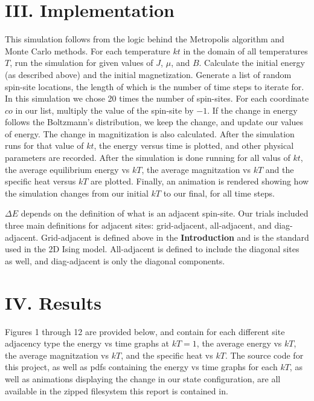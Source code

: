 \documentclass{article}
\begin{document}
\section*{III. Implementation}
\indent \indent This simulation follows from the logic behind the Metropolis algorithm
and Monte Carlo methods. For each temperature $kt$ in the domain of all
temperatures $T$,  run the simulation for given values of $J$, $\mu$, and $B$.
Calculate the initial energy (as described above) and the initial magnetization.
Generate a list of random spin-site locations, the length of which is the number
of time steps to iterate for. In this simulation we chose 20 times the number of 
spin-sites. For each coordinate $co$ in our list, multiply the value of the
spin-site by $-1$. If the change in energy follows the Boltzmann's distribution,
we keep the change, and update our values of energy. The change in magnitization 
is also calculated. After the simulation runs for that value of $kt$, the energy
versus time is plotted, and other physical parameters are recorded. After the
simulation is done running for all valus of $kt$, the average equilibrium energy
vs $kT$, the average magnitzation vs $kT$ and the specific heat versus $kT$ are
plotted. Finally, an animation is rendered showing how the simulation changes from
our initial $kT$ to our final, for all time steps.

\indent $\Delta E$ depends on the definition of what is an adjacent spin-site. 
Our trials included three main definitions for adjacent sites: grid-adjacent,
all-adjacent, and diag-adjacent. Grid-adjacent is defined above in the 
\textbf{Introduction} and is the standard used in the 2D Ising model. All-adjacent
is defined to include the diagonal sites as well, and diag-adjacent is only 
the diagonal components.
\section*{IV. Results}
\indent \indent Figures 1 through 12 are provided below, and contain for each different site adjacency type
the energy vs time graphs at $kT = 1$, the average energy vs $kT$, the average 
magnitzation vs $kT$, and the specific heat vs $kT$. The source code for this 
project, as well as pdfs containing the energy vs time graphs for each $kT$, as 
well as animations displaying the change in our state configuration, are all
available in the zipped filesystem this report is contained in.
\end{document}
